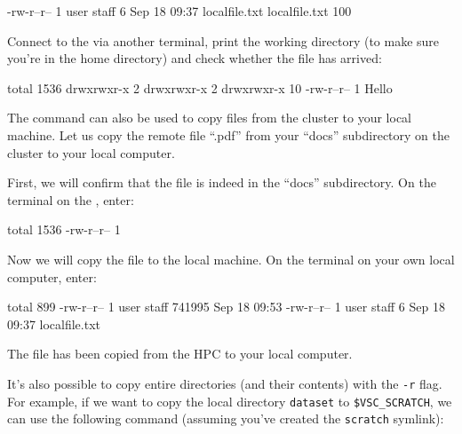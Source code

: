 \begin{prompt}
-rw-r--r-- 1 user  staff   6 Sep 18 09:37 localfile.txt
localfile.txt    100%
\end{prompt}

  Connect to the \hpc via another terminal, print the working directory (to make
  sure you're in the home directory) and check whether the file has arrived:

\begin{prompt}
total 1536
drwxrwxr-x  2 %
drwxrwxr-x  2 %
drwxrwxr-x 10 %
-rw-r--r--  1 %
Hello
\end{prompt}

  The  command can also be used to copy files from the cluster to your local machine.
  Let us copy the remote file ``\jobname.pdf'' from your ``docs''
  subdirectory on the cluster to your local computer.

  First, we will confirm that the file is indeed in the ``docs'' subdirectory.
  On the terminal on the \hpc, enter:

\begin{prompt}
total 1536
-rw-r--r-- 1 %
\end{prompt}

  Now we will copy the file to the local machine. On the terminal on your own local computer, enter:

\begin{prompt}
total  899
-rw-r--r--   1 user  staff  741995 Sep 18 09:53 %
-rw-r--r--   1 user  staff       6 Sep 18 09:37 localfile.txt
\end{prompt}

The file has been copied from the HPC to your local computer.

It's also possible to copy entire directories (and their contents) with the \lstinline|-r| flag.
For example, if we want to copy the local directory \lstinline|dataset| to \lstinline|$VSC_SCRATCH|,
we can use the following command (assuming you've created the \lstinline|scratch| symlink):

